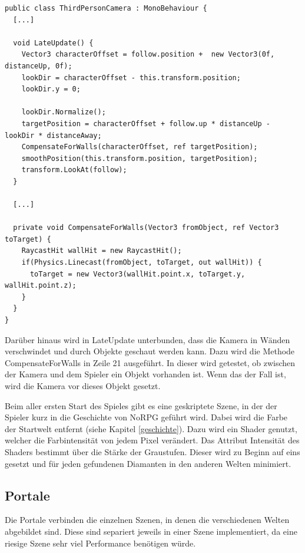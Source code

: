 \begin{scriptsize}
\lstset{
	float,
	caption=Methode LateUpdate aus ThirdPersonCamera.cs, 
	language=[Sharp]C, 
	frame=single,  
	showstringspaces=false, 
	showspaces=false, 
	numbers=left, 
	captionpos=b, 
	belowcaptionskip=4pt,
	basicstyle=\ttfamily
} 
\begin{lstlisting}[label=lst:lateupdate]
public class ThirdPersonCamera : MonoBehaviour {
  [...]
  
  void LateUpdate() {
    Vector3 characterOffset = follow.position +  new Vector3(0f, distanceUp, 0f);
    lookDir = characterOffset - this.transform.position;
    lookDir.y = 0;
    
    lookDir.Normalize();
    targetPosition = characterOffset + follow.up * distanceUp - lookDir * distanceAway;
    CompensateForWalls(characterOffset, ref targetPosition);
    smoothPosition(this.transform.position, targetPosition);
    transform.LookAt(follow);
  }

  [...]
  
  private void CompensateForWalls(Vector3 fromObject, ref Vector3 toTarget) {
    RaycastHit wallHit = new RaycastHit();
    if(Physics.Linecast(fromObject, toTarget, out wallHit)) {
      toTarget = new Vector3(wallHit.point.x, toTarget.y, wallHit.point.z);
    }
  }
}
\end{lstlisting}
\end{scriptsize}

			Darüber hinaus wird in LateUpdate unterbunden, dass die Kamera in Wänden verschwindet und durch Objekte geschaut werden kann. Dazu wird die Methode CompensateForWalls in Zeile 21 ausgeführt. In dieser wird getestet, ob zwischen der Kamera und dem Spieler ein Objekt vorhanden ist. Wenn das der Fall ist, wird die Kamera vor dieses Objekt gesetzt.

			Beim aller ersten Start des Spieles gibt es eine geskriptete Szene, in der der Spieler kurz in die Geschichte von NoRPG geführt wird. Dabei wird die Farbe der Startwelt entfernt (siehe Kapitel \ref{geschichte}). Dazu wird ein Shader genutzt, welcher die Farbintensität von jedem Pixel verändert. Das Attribut Intensität des Shaders bestimmt über die Stärke der Graustufen. Dieser wird zu Beginn auf eins gesetzt und für jeden gefundenen Diamanten in den anderen Welten minimiert.
    
		\subsection{Portale}
			Die Portale verbinden die einzelnen Szenen, in denen die verschiedenen Welten abgebildet sind. Diese sind separiert jeweils in einer Szene implementiert, da eine riesige Szene sehr viel Performance benötigen würde.
	
